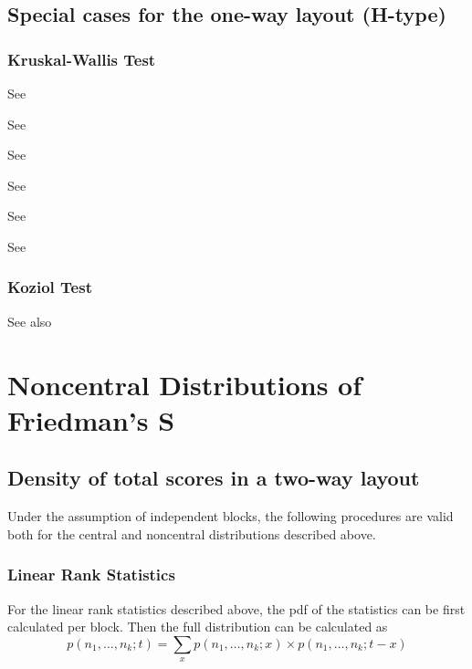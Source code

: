 \subsection{Special cases for the one-way layout (H-type)}
\subsubsection{Kruskal-Wallis Test}
See \cite{Spurrier2003}

See \cite{Robinson_1980}

See \cite{DiBucchianico_2005}

See \cite{vandeWiel_2004}

See \cite{Fan_2011}

See \cite{Fan_2012}

\subsubsection{Koziol Test}

See also \cite{Koziol1982}






\newpage
\section{Noncentral Distributions of Friedman's S}


\subsection{Density of total scores in a two-way layout}
Under the assumption of independent blocks, the following procedures are valid both for the central and noncentral distributions described above.

\subsubsection{Linear Rank Statistics}
For the linear rank statistics described above, the pdf of the statistics can be first calculated per block. Then the full distribution can be calculated as
\begin{equation} 
	p(n_1,\ldots,n_k; t) = \sum_{x} p(n_1,\ldots,n_k; x) \times p(n_1,\ldots,n_k; t-x)
\end{equation}



